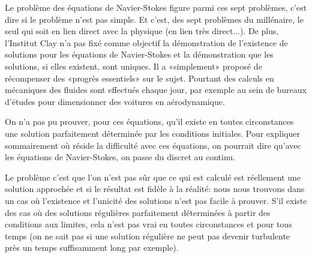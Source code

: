 \begin{histoire}
\medskip
Le problème des équations de Navier-Stokes  figure parmi ces sept problèmes, c'est dire si le problème n'est pas simple. Et c'est, des sept problèmes du millénaire, le seul qui soit en lien direct avec la physique (en lien très direct...). De plus, l'Institut Clay n'a pas fixé comme objectif la démonstration de l'existence de solutions pour les équations de Navier-Stokes et la démonstration que les solutions, si elles existent, sont uniques. Il a «simplement» proposé de récompenser des «progrès essentiels» sur le sujet. Pourtant des calculs en mécaniques des fluides sont effectués chaque jour, par exemple au sein de bureaux d'études pour dimensionner des voitures en aérodynamique.

On n'a pas pu prouver, pour ces équations, qu'il existe en toutes circonstances une solution parfaitement déterminée par les conditions initiales. Pour expliquer sommairement où réside la difficulté avec ces équations, on pourrait dire qu'avec les équations de Navier-Stokes, on passe du discret au continu.

\medskip
Le problème c'est que l'on n'est pas sûr que ce qui est calculé est réellement une solution approchée et si le résultat est fidèle à la réalité: nous nous trouvons dans un cas où l'existence et l'unicité des solutions n'est pas facile à prouver. S'il existe des cas où des solutions régulières parfaitement déterminées à partir des conditions aux limites, cela n'est pas vrai en toutes circonstances et pour tous temps (on ne sait pas si une solution régulière ne peut pas devenir turbulente près un temps suffisamment long par exemple).


\end{histoire}
